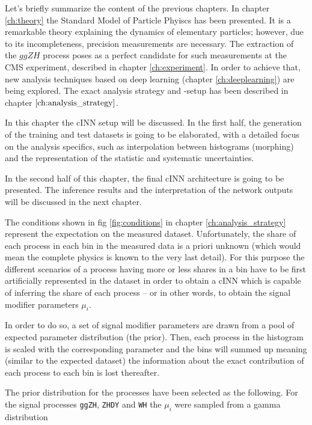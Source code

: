 
Let's briefly summarize the content of the previous chapters. In chapter \ref{ch:theory} the Standard Model of Particle Phyiscs has been presented. It is a remarkable theory explaining the dynamics of elementary particles; however, due to its incompleteness, precision measurements are necessary. The extraction of the $ggZH$ process poses as a perfect candidate for such measurements at the CMS experiment, described in chapter \ref{ch:experiment}. In order to achieve that, new analysis techniques based on deep learning (chapter \ref{ch:deeplearning}) are being explored. The exact analysis strategy and -setup has been described in chapter $\ref{ch:analysis_strategy}$.

In this chapter the cINN setup will be discussed. In the first half, the generation of the training and test datasets is going to be elaborated, with a detailed focus on the analysis specifics, such as interpolation between histograms (morphing) and the representation of the statistic and systematic uncertainties.

In the second half of this chapter, the final cINN architecture is going to be presented. The inference results and the interpretation of the network outputs will be discussed in the next chapter.


The conditions shown in fig \ref{fig:conditions} in chapter \ref{ch:analysis_strategy} represent the expectation on the measured dataset. Unfortunately, the share of each process in each bin in the measured data is a priori unknown (which would mean the complete physics is known to the very last detail). For this purpose the different scenarios of a process having more or less shares in a bin have to be first artificially represented in the dataset in order to obtain a cINN which is capable of inferring the share of each process -- or in other words, to obtain the signal modifier parameters $\mu_i$.


In order to do so, a set of signal modifier parameters are drawn from a pool of expected parameter distribution (the prior). Then, each process in the histogram is scaled with the corresponding parameter and the bins will summed up meaning (similar to the expected dataset) the information about the exact contribution of each process to each bin is lost thereafter.

The prior distribution for the processes have been selected as the following. For the signal processes \texttt{ggZH}, \texttt{ZHDY} and \texttt{WH} the $\mu_i$ were sampled from a gamma distribution

